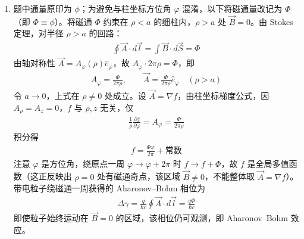 \begin{enumerate}
{\begin{enumerate}
		规范变换下保持薛定谔方程不变，波函数需乘以相位因子：
		\begin{align*}
			\psi_{A_1}=\exp\!\left(\frac{iq\chi}{\hbar c}\right)\psi_A=\exp\!\left(\frac{iqB_0 xy}{2\hbar c}\right)\psi_A
		\end{align*}

		\item 题中通量原印为 $\phi$；为避免与柱坐标方位角 $\varphi$ 混淆，以下将磁通量改记为 $\Phi$（即 $\Phi\equiv\phi$）。将磁通 $\Phi$ 约束在 $\rho<a$ 的细柱内，$\rho>a$ 处 $\vec{B}=0$。由 Stokes 定理，对半径 $\rho>a$ 的回路：
		\begin{align*}
			\oint \vec{A}\cdot d\vec{l}=\int \vec{B}\cdot d\vec{S}=\Phi
		\end{align*}
		由轴对称性 $\vec{A}=A_{\varphi}(\rho)\hat{e}_{\varphi}$，故 $A_{\varphi}\cdot 2\pi\rho=\Phi$，即
		\begin{align*}
			A_{\varphi}=\frac{\Phi}{2\pi\rho},\qquad \vec{A}=\frac{\Phi}{2\pi\rho}\hat{e}_{\varphi}\quad(\rho>a)
		\end{align*}
		令 $a\to 0$，上式在 $\rho\neq 0$ 处成立。设 $\vec{A}=\nabla f$，由柱坐标梯度公式，因 $A_{\rho}=A_z=0$，$f$ 与 $\rho,z$ 无关，仅
		\begin{align*}
			\frac{1}{\rho}\frac{\partial f}{\partial\varphi}=A_{\varphi}=\frac{\Phi}{2\pi\rho}
		\end{align*}
		积分得
		\begin{align*}
			f=\frac{\Phi\varphi}{2\pi}+\text{常数}
		\end{align*}
		注意 $\varphi$ 是方位角，绕原点一周 $\varphi\to\varphi+2\pi$ 时 $f\to f+\Phi$，故 $f$ 是全局多值函数（这正反映出 $\rho=0$ 处有磁通奇点，该区域 $\vec{B}\neq 0$，不能整体取 $\vec{A}=\nabla f$）。带电粒子绕磁通一周获得的 Aharonov--Bohm 相位为
		\begin{align*}
			\Delta\gamma=\frac{q}{\hbar c}\oint\vec{A}\cdot d\vec{l}=\frac{q\Phi}{\hbar c}
		\end{align*}
		即使粒子始终运动在 $\vec{B}=0$ 的区域，该相位仍可观测，即 Aharonov--Bohm 效应。
	\end{enumerate}
	}

\end{enumerate}
